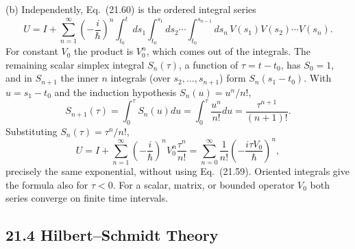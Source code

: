 (b) Independently, Eq.~(21.60) is the ordered integral series
\[
U=I+\sum_{n=1}^\infty
\left(-\frac{i}{\hbar}\right)^n
\int_{t_0}^t ds_1\int_{t_0}^{s_1}ds_2\cdots
\int_{t_0}^{s_{n-1}}ds_n\,
V(s_1)V(s_2)\cdots V(s_n).
\]
For constant $V_0$ the product is $V_0^n$, which comes out of the
integrals. The remaining scalar simplex integral $S_n(\tau)$, a
function of $\tau=t-t_0$, has $S_0=1$, and in $S_{n+1}$ the inner $n$
integrals (over $s_2,\dots,s_{n+1}$) form $S_n(s_1-t_0)$. With
$u=s_1-t_0$ and the induction hypothesis $S_n(u)=u^n/n!$,
\[
S_{n+1}(\tau)=\int_0^\tau S_n(u)du
=\int_0^\tau\frac{u^n}{n!}du
=\frac{\tau^{n+1}}{(n+1)!}.
\]
Substituting $S_n(\tau)=\tau^n/n!$,
\[
U=I+\sum_{n=1}^\infty\left(-\frac{i}{\hbar}\right)^nV_0^n
\frac{\tau^n}{n!}
=\sum_{n=0}^\infty\frac1{n!}\left(-\frac{i\tau V_0}{\hbar}\right)^n,
\]
precisely the same exponential, without using
Eq.~(21.59). Oriented integrals give the formula also for $\tau<0$.
For a scalar, matrix, or bounded operator $V_0$ both series converge
on finite time intervals.


\subsection*{21.4 Hilbert--Schmidt Theory}

